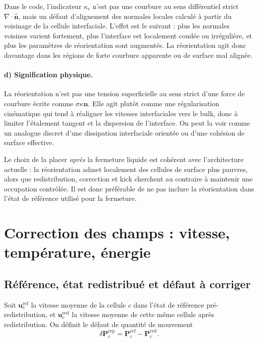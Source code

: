 \documentclass[11pt,a4paper]{article}
\begin{document}
Dans le code, l'indicateur $\kappa_c$ n'est pas une courbure au sens différentiel strict $\nabla\cdot\widehat{\bm n}$, mais un défaut d'alignement des normales locales calculé à partir du voisinage de la cellule interfaciale. L'effet est le suivant : plus les normales voisines varient fortement, plus l'interface est localement coudée ou irrégulière, et plus les paramètres de réorientation sont augmentés. La réorientation agit donc davantage dans les régions de forte courbure apparente ou de surface mal alignée.

\paragraph{d) Signification physique.}
La réorientation n'est pas une tension superficielle au sens strict d'une force de courbure écrite comme $\sigma \kappa \bm{n}$. Elle agit plutôt comme une régularisation cinématique qui tend à réaligner les vitesses interfaciales vers le bulk, donc à limiter l'étalement tangent et la dispersion de l'interface. On peut la voir comme un analogue discret d'une dissipation interfaciale orientée ou d'une cohésion de surface effective.

Le choix de la placer \emph{après} la fermeture liquide est cohérent avec l'architecture actuelle : la réorientation admet localement des cellules de surface plus pauvres, alors que redistribution, correction et kick cherchent au contraire à maintenir une occupation contrôlée. Il est donc préférable de ne pas inclure la réorientation dans l'état de référence utilisé pour la fermeture.

\section{Correction des champs : vitesse, température, énergie}

\subsection{Référence, état redistribué et défaut à corriger}

Soit $\bm{u}_c^{\mathrm{ref}}$ la vitesse moyenne de la cellule $c$ dans l'état de référence pré-redistribution, et $\bm{u}_c^{\mathrm{red}}$ la vitesse moyenne de cette même cellule après redistribution. On définit le défaut de quantité de mouvement
\begin{equation}
 \delta \bm{P}_c^{\mathrm{rep}} = \bm{P}_c^{\mathrm{ref}} - \bm{P}_c^{\mathrm{red}}.
\end{equation}
\end{document}
